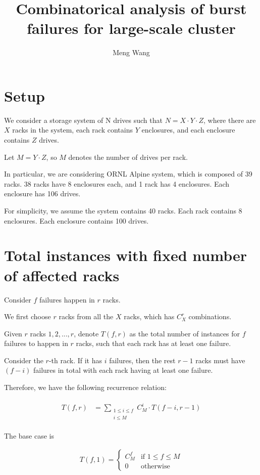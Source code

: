 \documentclass{article}
\title{Combinatorical analysis of burst failures for large-scale cluster}
\author{Meng Wang}
\begin{document}
\maketitle

\section{Setup}
We consider a storage system of N drives such that $N = X \cdot Y \cdot Z$, where there are $X$ racks in the system, each rack contains $Y$ enclosures, and each enclosure contains $Z$ drives.

Let $M = Y \cdot Z$, so $M$ denotes the number of drives per rack.

In particular, we are considering ORNL Alpine system, which is composed of 39 racks. 38 racks have 8 enclosures each, and 1 rack has 4 enclosures. Each enclosure has 106 drives.

For simplicity, we assume the system contains 40 racks. Each rack contains 8 enclosures. Each enclosure contains 100 drives.

\section{Total instances with fixed number of affected racks}

Consider $f$ failures happen in $r$ racks.

We first choose $r$ racks from all the $X$ racks, which has $C_{X}^{r}$ combinations.

Given $r$ racks $1,2,...,r$, denote $T(f,r)$ as the total number of instances for $f$ failures to happen in $r$ racks, such that each rack has at least one failure.

Consider the $r$-th rack. If it has $i$ failures, then the rest $r-1$ racks must have $(f-i)$ failures in total with each rack having at least one failure.

Therefore, we have the following recurrence relation:

\begin{eqnarray}
\begin{aligned}
  T(f,r)
  &= \sum_{\substack{1 \leq i \leq f \\ i \leq M}} C_M^i \cdot T(f-i, r-1)
\end{aligned}
\label{eq:total:rec}
\end{eqnarray}

The base case is 

\begin{eqnarray}
  T(f,1) =
    \begin{cases}
      C_M^f& \text{if $1 \leq f \leq M$}\\
      0 & \text{otherwise}
    \end{cases}       
\label{eq:total:base}
\end{eqnarray}
\end{document}
